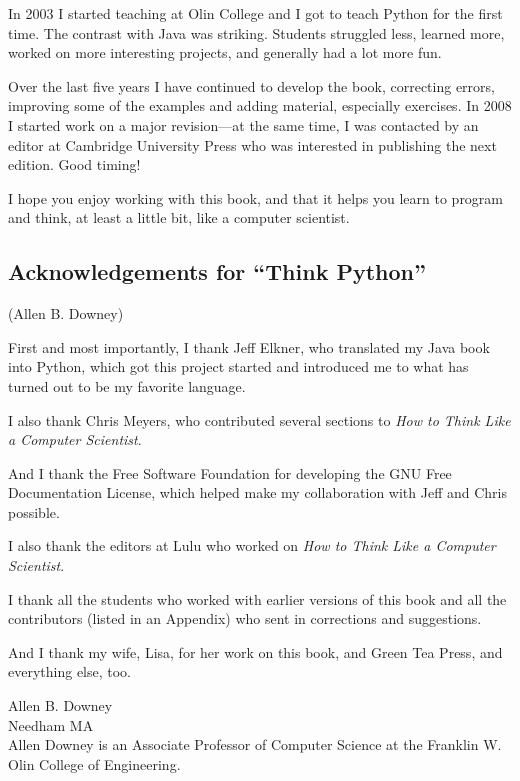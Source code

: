 \documentclass[10pt]{book}
\begin{document}
In 2003 I started teaching at Olin College and I got to teach
Python for the first time.  The contrast with Java was striking.
Students struggled less, learned more, worked on more interesting
projects, and generally had a lot more fun.

Over the last five years I have continued to develop the book,
correcting errors, improving some of the examples and
adding material, especially exercises.  In 2008 I started work
on a major revision---at the same time, I was
contacted by an editor at Cambridge University Press who
was interested in publishing the next edition.  Good timing!

I hope you enjoy working with this book, and that it helps
you learn to program and think, at least a little bit, like
a computer scientist.

\subsection*{Acknowledgements for ``Think Python''}

(Allen B. Downey)

First and most importantly, I thank Jeff Elkner, who
translated my Java book into Python, which got this project
started and introduced me to what has turned out to be my
favorite language.

I also thank Chris Meyers, who contributed several sections
to {\em How to Think Like a Computer Scientist}.

And I thank the Free Software Foundation for developing
the GNU Free Documentation License, which helped make
my collaboration with Jeff and Chris possible.


I also thank the editors at Lulu who worked on
{\em How to Think Like a Computer Scientist}.

I thank all the students who worked with earlier
versions of this book and all the contributors (listed
in an Appendix) who sent in corrections and suggestions.

And I thank my wife, Lisa, for her work on this book, and Green
Tea Press, and everything else, too.

Allen B. Downey \\
Needham MA\\

Allen Downey is an Associate Professor of Computer Science at 
the Franklin W. Olin College of Engineering.
\end{document}
